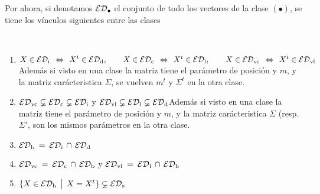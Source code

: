 Por ahora, si  denotamos $\mathcal{ED}_{\bullet}$ el conjunto de todo  los vectores de la
clase $(\bullet)$, se tiene los v\'inculos siguientes entre las clases
%
\begin{lema}

  \

  \begin{enumerate}
  \item\label{Enum:MP:EDM_Transpuesta} $X \in \mathcal{ED}_{\mathrm{i}} \:\: \Leftrightarrow \:\:
    X^t \in  \mathcal{ED}_{\mathrm{d}}, \qquad X \in  \mathcal{ED}_{\mathrm{c}} \:\: \Leftrightarrow  \:\: X^t \in
    \mathcal{ED}_{\mathrm{l}},  \qquad  X  \in   \mathcal{ED}_{\mathrm{vc}}  \:\:  \Leftrightarrow  \:\:  X^t  \in
    \mathcal{ED}_{\mathrm{vl}}$\newline  Adem\'as si  visto  en  una clase  la  matriz tiene  el
    par\'ametro de posici\'on  y $m$, y la matriz  car\'acteristica $\Sigma$, se
    vuelven $m^t$ y $\Sigma^t$ en la otra clase.
  \item\label{Enum:MP:EDM_Inclusiones}    $\mathcal{ED}_{\mathrm{vc}}    \varsubsetneq   \mathcal{ED}_{\mathrm{c}}
    \varsubsetneq  \mathcal{ED}_{\mathrm{i}}$ \qquad y  \qquad $\mathcal{ED}_{\mathrm{vl}}  \varsubsetneq \mathcal{ED}_{\mathrm{l}}
    \varsubsetneq \mathcal{ED}_{\mathrm{d}}$\newline  Adem\'as si visto  en una clase  la matriz
    tiene  el par\'ametro  de posici\'on  y  $m$, y  la matriz  car\'acteristica
    $\Sigma$ (resp. $\Sigma'$, son los mismos par\'ametros en la otra clase.
  \item\label{Enum:MP:EDM_Bilateral}  $\mathcal{ED}_{\mathrm{b}}  \: =  \:  \mathcal{ED}_{\mathrm{i}}  \, \cap  \,
    \mathcal{ED}_{\mathrm{d}}$
  \item\label{Enum:MP:EDM_VcBilateral} $\mathcal{ED}_{\mathrm{vc}}  \: =  \: \mathcal{ED}_{\mathrm{c}} \,  \cap \,
    \mathcal{ED}_{\mathrm{b}}$ \qquad y \qquad $\mathcal{ED}_{\mathrm{vl}} \: = \: \mathcal{ED}_{\mathrm{l}} \, \cap \, \mathcal{ED}_{\mathrm{b}}$
  \item\label{Enum:MP:EDM_Simetrica}  $\{  X  \in   \mathcal{ED}_{\mathrm{b}}  \:\: \big| \:\:  X  =  X^t  \}
    \varsubsetneq \mathcal{ED}_{\mathrm{s}}$
  \end{enumerate}
\end{lema}
%

